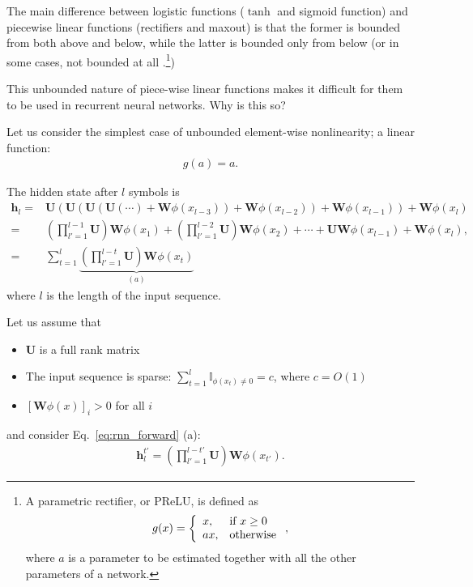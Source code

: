 \documentclass{report}
\newcommand{\vect}[1]{\mathbf{#1}}
\newcommand{\matr}[1]{\mathbf{#1}}
\newcommand{\vh}[0]{\vect{h}}
\newcommand{\mW}[0]{\matr{W}}
\newcommand{\mU}[0]{\matr{U}}
\newcommand{\II}[0]{\mathbb{I}}
\begin{document}
The main difference between logistic functions
($\tanh$ and sigmoid function) and piecewise linear functions (rectifiers and
maxout) is that the former is bounded from both above and below, while the
latter is bounded only from below (or in some cases, not bounded at all
\citep{he2015delving}.\footnote{
    A parametric rectifier, or PReLU, is defined as
    \begin{align*}
        g(x) = \left\{ 
            \begin{array}{l l}
                x, & \text{if }x \geq 0 \\
                ax, & \text{otherwise}
            \end{array}
            \right.,
    \end{align*}
    where $a$ is a parameter to be estimated together with all the other
    parameters of a network.
})

This unbounded nature of piece-wise linear functions makes it difficult for them
to be used in recurrent neural networks. Why is this so?

Let us consider the simplest case of unbounded element-wise nonlinearity; a
linear function:
\begin{align*}
    g(a) = a.
\end{align*}

The hidden state after $l$ symbols is
\begin{align}
    \vh_l =& \mU(\mU (\mU (\mU (\cdots) + \mW\phi(x_{l-3})) + \mW\phi(x_{l-2})) +
    \mW\phi(x_{l-1})) + \mW\phi(x_l) 
    \nonumber
    \\
    =& \left(\prod_{l'=1}^{l-1} \mU\right) \mW\phi(x_{1})
    + \left(\prod_{l'=1}^{l-2} \mU\right) \mW\phi(x_{2})
    + \cdots 
    + \mU \mW \phi(x_{l-1}) 
    + \mW \phi(x_l), 
    \nonumber
    \\
    \label{eq:rnn_forward}
    =& \sum_{t=1}^l \underbrace{\left( \prod_{l'=1}^{l-t} \mU\right) \mW\phi(x_t)}_{(a)}
\end{align}
where $l$ is the length of the input sequence.

Let us assume that
\begin{itemize}
    \itemsep 0em
    \item $\mU$ is a full rank matrix
    \item The input sequence is sparse: $\sum_{t=1}^l \II_{\phi(x_t) \neq 0} =
        c$, where $c=O(1)$
    \item $\left[ \mW \phi(x) \right]_i > 0$ for all $i$
\end{itemize}
and consider Eq.~\eqref{eq:rnn_forward} (a):
\begin{align}
    \label{eq:rnn_forward_one}
    \vh_l^{t'} = \left( \prod_{l'=1}^{l-t'} \mU\right) 
    \mW\phi(x_{t'}).
\end{align}
\end{document}
